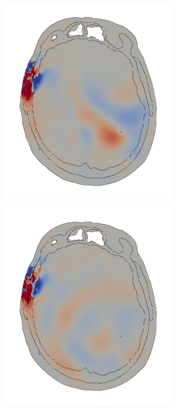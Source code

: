 \documentclass[a4paper]{article}
\numberwithin{equation}{section}
\begin{document}
\begin{figure}[h]
\begin{subfigure}{.18\textwidth}
\end{subfigure}
\begin{subfigure}{.18\textwidth}
  \centering
  \includegraphics[width=1.0\linewidth]{pictures/skull/elastic-pressure-z-with-bounds/six/4.png}
\end{subfigure}
\begin{subfigure}{.18\textwidth}
  \centering
  \includegraphics[width=1.0\linewidth]{pictures/skull/elastic-pressure-z-with-bounds/six/5.png}

\end{subfigure}
\end{figure}
\end{document}
